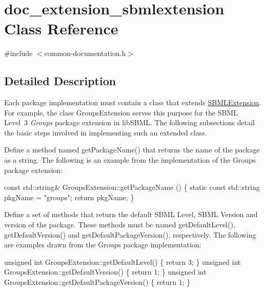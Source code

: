 \hypertarget{classdoc__extension__sbmlextension}{}\section{doc\+\_\+extension\+\_\+sbmlextension Class Reference}
\label{classdoc__extension__sbmlextension}


{\ttfamily \#include $<$common-\/documentation.\+h$>$}



\subsection{Detailed Description}
\begin{DoxyParagraph}{}
Each package implementation must contain a class that extends \hyperlink{class_s_b_m_l_extension}{S\+B\+M\+L\+Extension}. For example, the class {\ttfamily Groups\+Extension} serves this purpose for the S\+B\+ML Level~3 {\itshape Groups} package extension in lib\+S\+B\+ML. The following subsections detail the basic steps involved in implementing such an extended class.
\end{DoxyParagraph}


Define a method named {\ttfamily get\+Package\+Name()} that returns the name of the package as a string. The following is an example from the implementation of the Groups package extension\+: 
\begin{DoxyCode}
\textcolor{keyword}{const} std::string& GroupsExtension::getPackageName ()
\{
      \textcolor{keyword}{static} \textcolor{keyword}{const} std::string pkgName = \textcolor{stringliteral}{"groups"};
      \textcolor{keywordflow}{return} pkgName;
\}
\end{DoxyCode}


Define a set of methods that return the default S\+B\+ML Level, S\+B\+ML Version and version of the package. These methods must be named {\ttfamily get\+Default\+Level()}, {\ttfamily get\+Default\+Version()} and {\ttfamily get\+Default\+Package\+Version()}, respectively. The following are examples drawn from the Groups package implementation\+: 
\begin{DoxyCode}
\textcolor{keywordtype}{unsigned} \textcolor{keywordtype}{int} GroupsExtension::getDefaultLevel()
\{
      \textcolor{keywordflow}{return} 3;
\}
\textcolor{keywordtype}{unsigned} \textcolor{keywordtype}{int} GroupsExtension::getDefaultVersion()
\{
      \textcolor{keywordflow}{return} 1;
\}
\textcolor{keywordtype}{unsigned} \textcolor{keywordtype}{int} GroupsExtension::getDefaultPackageVersion()
\{
      \textcolor{keywordflow}{return} 1;
\}
\end{DoxyCode}


